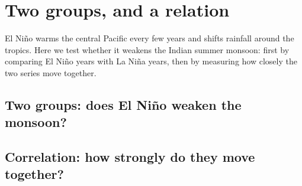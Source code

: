 \chapter{Two groups, and a relation}\label{ch:two}
El Ni\~no warms the central Pacific every few years and shifts rainfall around the tropics. Here we test whether it weakens the Indian summer monsoon: first by comparing El Ni\~no years with La Ni\~na years, then by measuring how closely the two series move together.

\section{Two groups: does El Ni\~no weaken the monsoon?}

\section{Correlation: how strongly do they move together?}

